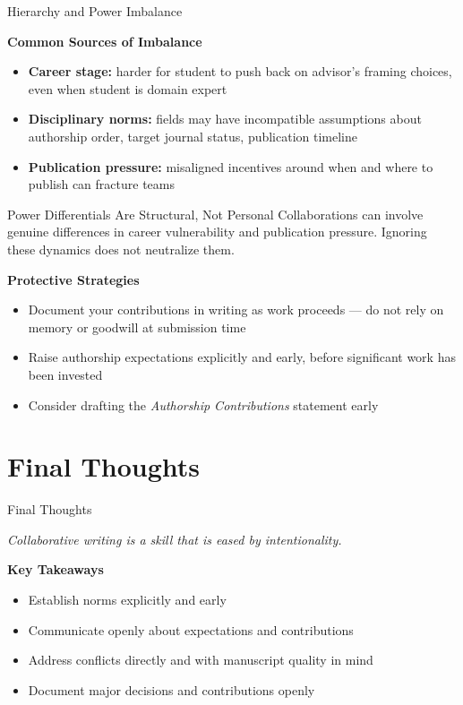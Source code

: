 \documentclass{beamer}
\begin{document}
\begin{frame}{Hierarchy and Power Imbalance}

  \footnotesize
  \textbf{Common Sources of Imbalance}
  \begin{itemize}
    \item \textbf{Career stage:} harder for student to
      push back on advisor's framing choices, even when student is domain expert
    \item \textbf{Disciplinary norms:} fields may have incompatible assumptions about authorship
      order, target journal status, publication timeline
    \item \textbf{Publication pressure:} misaligned incentives
      around when and where to publish can fracture teams
  \end{itemize}

  \begin{block}{Power Differentials Are Structural, Not Personal}
  Collaborations can involve genuine differences in career vulnerability and publication pressure. 
  Ignoring these dynamics does not neutralize them.
  \end{block}

  \textbf{Protective Strategies}
  \begin{itemize}
    \item Document your contributions in writing as work proceeds ---
      do not rely on memory or goodwill at submission time
    \item Raise authorship expectations explicitly and early,
      before significant work has been invested
    \item Consider drafting the \emph{Authorship Contributions} statement early
  \end{itemize}

\end{frame}


\section{Final Thoughts}
\begin{frame}{Final Thoughts}

  \begin{center}
    \emph{Collaborative writing is a skill that is eased by intentionality.}
  \end{center}

  \vspace{2em}
  \textbf{Key Takeaways}
  \begin{itemize}
    \item Establish norms explicitly and early
    \item Communicate openly about expectations and contributions
    \item Address conflicts directly and with manuscript quality in mind
    \item Document major decisions and contributions openly
  \end{itemize}
\end{frame}
\end{document}
